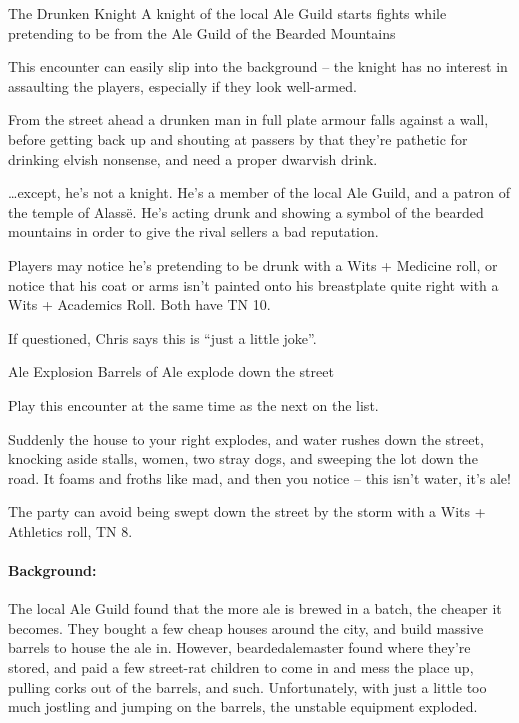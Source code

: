 \begin{multicols}{2}
{The Drunken Knight}%
{A knight of the local Ale Guild starts fights while pretending to be from the Ale Guild of the Bearded Mountains}%

This encounter can easily slip into the background -- the knight has no interest in assaulting the players, especially if they look well-armed.

\begin{boxtext}

	From the street ahead a drunken man in full plate armour falls against a wall, before getting back up and shouting at passers by that they're pathetic for drinking elvish nonsense, and need a proper dwarvish drink.

\end{boxtext}

\ldots except, he's not a knight.
He's a member of the local Ale Guild, and a patron of the temple of Alass\"{e}.
He's acting drunk and showing a symbol of the bearded mountains in order to give the rival sellers a bad reputation.

Players may notice he's pretending to be drunk with a Wits + Medicine roll, or notice that his coat or arms isn't painted onto his breastplate quite right with a Wits + Academics Roll.  Both have TN 10.



If questioned, Chris says this is ``just a little joke''.

{Ale Explosion}%
{Barrels of Ale explode down the street}%

Play this encounter at the same time as the next on the list.

\begin{boxtext}

	Suddenly the house to your right explodes, and water rushes down the street, knocking aside stalls, women, two stray dogs, and sweeping the lot down the road.  It foams and froths like mad, and then you notice -- this isn't water, it's ale!

\end{boxtext}

The party can avoid being swept down the street by the storm with a Wits + Athletics roll, TN 8.

\paragraph{Background:} The local Ale Guild found that the more ale is brewed in a batch, the cheaper it becomes.
They bought a few cheap houses around the city, and build massive barrels to house the ale in.
However, \gls{beardedalemaster} found where they're stored, and paid a few street-rat children to come in and mess the place up, pulling corks out of the barrels, and such.
Unfortunately, with just a little too much jostling and jumping on the barrels, the unstable equipment exploded.


\end{multicols}
